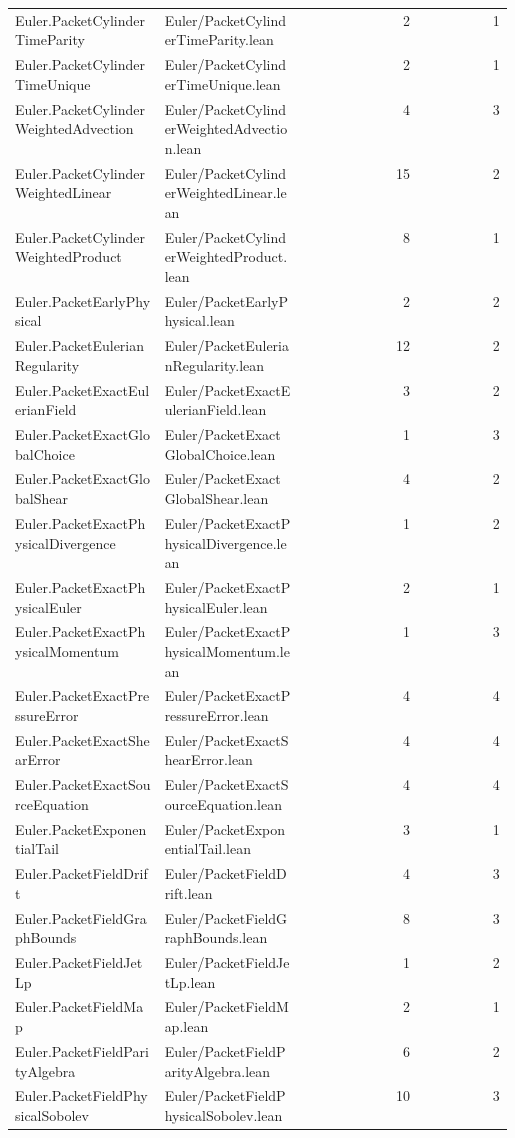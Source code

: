 \begin{longtable}{p{0.30\linewidth}p{0.28\linewidth}rr}
Euler.PacketCylinderTimeParity & Euler/PacketCylinderTimeParity.lean & 2 & 1\\
Euler.PacketCylinderTimeUnique & Euler/PacketCylinderTimeUnique.lean & 2 & 1\\
Euler.PacketCylinderWeightedAdvection & Euler/PacketCylinderWeightedAdvection.lean & 4 & 3\\
Euler.PacketCylinderWeightedLinear & Euler/PacketCylinderWeightedLinear.lean & 15 & 2\\
Euler.PacketCylinderWeightedProduct & Euler/PacketCylinderWeightedProduct.lean & 8 & 1\\
Euler.PacketEarlyPhysical & Euler/PacketEarlyPhysical.lean & 2 & 2\\
Euler.PacketEulerianRegularity & Euler/PacketEulerianRegularity.lean & 12 & 2\\
Euler.PacketExactEulerianField & Euler/PacketExactEulerianField.lean & 3 & 2\\
Euler.PacketExactGlobalChoice & Euler/PacketExactGlobalChoice.lean & 1 & 3\\
Euler.PacketExactGlobalShear & Euler/PacketExactGlobalShear.lean & 4 & 2\\
Euler.PacketExactPhysicalDivergence & Euler/PacketExactPhysicalDivergence.lean & 1 & 2\\
Euler.PacketExactPhysicalEuler & Euler/PacketExactPhysicalEuler.lean & 2 & 1\\
Euler.PacketExactPhysicalMomentum & Euler/PacketExactPhysicalMomentum.lean & 1 & 3\\
Euler.PacketExactPressureError & Euler/PacketExactPressureError.lean & 4 & 4\\
Euler.PacketExactShearError & Euler/PacketExactShearError.lean & 4 & 4\\
Euler.PacketExactSourceEquation & Euler/PacketExactSourceEquation.lean & 4 & 4\\
Euler.PacketExponentialTail & Euler/PacketExponentialTail.lean & 3 & 1\\
Euler.PacketFieldDrift & Euler/PacketFieldDrift.lean & 4 & 3\\
Euler.PacketFieldGraphBounds & Euler/PacketFieldGraphBounds.lean & 8 & 3\\
Euler.PacketFieldJetLp & Euler/PacketFieldJetLp.lean & 1 & 2\\
Euler.PacketFieldMap & Euler/PacketFieldMap.lean & 2 & 1\\
Euler.PacketFieldParityAlgebra & Euler/PacketFieldParityAlgebra.lean & 6 & 2\\
Euler.PacketFieldPhysicalSobolev & Euler/PacketFieldPhysicalSobolev.lean & 10 & 3\\

\end{longtable}
